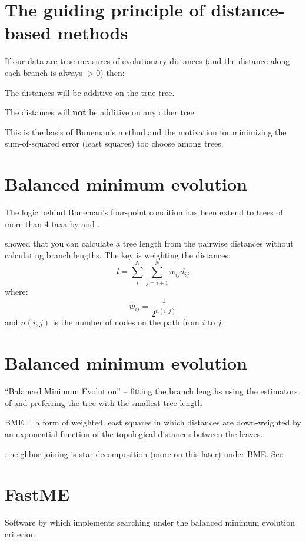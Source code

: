 \documentclass[landscape]{foils}
\begin{document}
\myNewSlide
\section*{The guiding principle of distance-based methods}
If our data are true measures of evolutionary distances (and the distance along each branch is always $>0$)
then:
\begin{compactenum}
	\item The distances will be additive on the true tree.
	\item The distances will {\bf not} be additive on any other tree.
\end{compactenum}
This is the basis of Buneman's method and the motivation for minimizing the sum-of-squared error (least squares) too choose among trees.



\myNewSlide
\section*{Balanced minimum evolution}
\large
The logic behind Buneman's four-point condition has been extend to trees of more than 4 taxa by \citet{Pauplin2000} and \citet{SempleS2004}.

\cite{Pauplin2000} showed that you can calculate a tree length from the pairwise distances without calculating branch lengths.
The key is weighting the distances:
\[l = \sum_i^N\sum_{j=i+1}^N w_{ij} d_{ij}\] 
where:
\[w_{ij} = \frac{1}{2^{n(i,j)}}\]
and $n(i,j)$ is the number of nodes on the path from $i$ to $j$.

\section*{Balanced minimum evolution}

``Balanced Minimum Evolution'' \citet{DesperG2002,DesperG2004} -- fitting the branch lengths using the estimators of \citet{Pauplin2000} and preferring the tree with the smallest tree length 

BME = a form of weighted least squares in which distances are down-weighted by an exponential function of the topological distances between the leaves.

\citet{DesperG2005}: neighbor-joining is star decomposition (more on this later) under BME. See \citet{GascuelS2006}

\myNewSlide
\section*{FastME}
Software by \citet{DesperG2004} which implements searching under the balanced minimum evolution criterion. 
\end{document}

